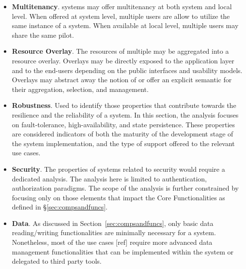 \documentclass{sig-alternate}
\begin{document}
\begin{itemize}
\item \textbf{Multitenancy}. \pilot systems may offer multitenancy at both
  system and local level. When offered at system level, multiple users are allow
  to utilize the same instance of a \pilot system. When available at local
  level, multiple users may share the same pilot.

\item \textbf{Resource Overlay}. The resources of multiple \pilots may be
  aggregated into a resource overlay. Overlays may be directly exposed to the
  application layer and to the end-users depending on the public interfaces and
  usability models. Overlays may abstract away the notion of \pilot or offer an
  explicit semantic for their aggregation, selection, and management.

\item \textbf{Robustness}. Used to identify those properties that contribute
  towards the resilience and the reliability of a \pilot system. In this
  section, the analysis focuses on fault-tolerance, high-availability, and state
  persistence. These properties are considered indicators of both the maturity
  of the development stage of the \pilot system implementation, and the type of
  support offered to the relevant use cases.


\item \textbf{Security}. The properties of \pilot systems related to
  security would require a dedicated analysis. The analysis here is limited to
  authentication, authorization paradigms. The scope of the analysis is further
  constrained by focusing only on those elements that impact the Core
  Functionalities as defined in \S\ref{sec:compsandfuncs}.

\item \textbf{Data}. As discussed in Section~\ref{sec:compsandfuncs}, only
  basic data reading/writing functionalities are minimally necessary for a
  \pilot system.  Nonetheless, most of the use cases [ref] require more
  advanced data management functionalities that can be implemented within the
  \pilot system or delegated to third party tools.


\end{itemize}
\end{document}

